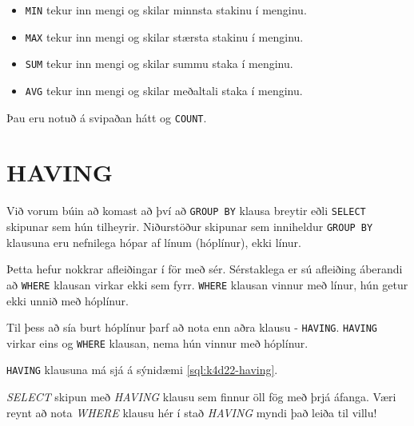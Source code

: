 \begin{itemize}
 \item \verb|MIN| tekur inn mengi og skilar minnsta stakinu í menginu.
 \item \verb|MAX| tekur inn mengi og skilar stærsta stakinu í menginu.
 \item \verb|SUM| tekur inn mengi og skilar summu staka í menginu.
 \item \verb|AVG| tekur inn mengi og skilar meðaltali staka í menginu.
\end{itemize}

Þau eru notuð á svipaðan hátt og \verb|COUNT|.
\section{HAVING}
Við vorum búin að komast að því að \verb|GROUP BY| klausa breytir eðli \verb|SELECT| skipunar sem hún tilheyrir. Niðurstöður skipunar sem inniheldur \verb|GROUP BY| klausuna eru nefnilega hópar af línum (hóplínur), ekki línur.

Þetta hefur nokkrar afleiðingar í för með sér. Sérstaklega er sú afleiðing áberandi að \verb|WHERE| klausan virkar ekki sem fyrr. \verb|WHERE| klausan vinnur með línur, hún getur ekki unnið með hóplínur.

Til þess að sía burt hóplínur þarf að nota enn aðra klausu - \verb|HAVING|. \verb|HAVING| virkar eins og \verb|WHERE| klausan, nema hún vinnur með hóplínur. 

\verb|HAVING| klausuna má sjá á sýnidæmi \ref{sql:k4d22-having}.

\begin{example}
\caption[HAVING]{\emph{SELECT} skipun með \emph{HAVING} klausu sem finnur öll fög með þrjá áfanga. Væri reynt að nota \emph{WHERE} klausu hér í stað \emph{HAVING} myndi það leiða til villu!}
\label{sql:k4d22-having}
\centering
{}
\end{example}


